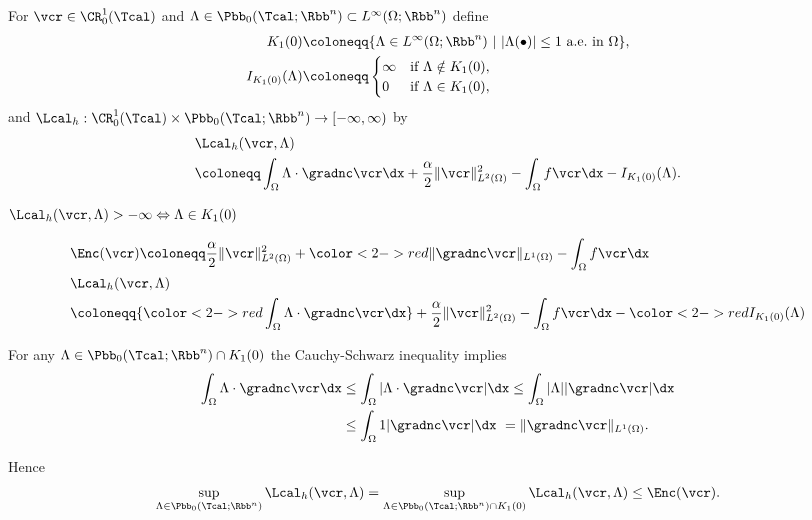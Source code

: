 \begin{frame}
  For $\vcr\in\CR^1_0(\Tcal)$ and $\Lambda\in\Pbb_0(\Tcal;\Rbb^n)\subset
  L^\infty(\Omega;\Rbb^n)$ define
  \begin{align*}
    K_1(0)
    &\coloneqq 
    \{\Lambda\in L^\infty(\Omega;\Rbb^n)\ | \ |\Lambda(\bullet)|
    \leq 1 \text{ a.e.\ in }\Omega\},\\
    I_{K_1(0)}(\Lambda)
    &\coloneqq
    \begin{cases}
      \infty & \text{if } \Lambda\notin K_1(0),\\
      0       & \text{if } \Lambda\in K_1(0),
    \end{cases}
  \end{align*}
  \pause
  and $\Lcal_h:\CR^1_0(\Tcal)\times \Pbb_0(\Tcal;\Rbb^n)\to
  [-\infty,\infty)$ by
  \begin{align*}
    &\Lcal_h(\vcr,\Lambda) \\
    &\coloneqq \int_\Omega\Lambda\cdot\gradnc\vcr\dx +
    \frac{\alpha}{2}\Vert \vcr\Vert^2_{L^2(\Omega)} -\int_\Omega f\vcr\dx
    - I_{K_1(0)}(\Lambda).
  \end{align*}

  \pause
  \bigskip

  $\Lcal_h(\vcr,\Lambda)>-\infty \Leftrightarrow \Lambda\in K_1(0)$
\end{frame}

\begin{frame}
  \begin{align*}
    &\Enc(\vcr)\coloneqq \frac{\alpha}{2}\Vert \vcr\Vert_{L^2(\Omega)}^2
    +{\color<2->{red}\Vert \gradnc\vcr\Vert_{L^1(\Omega)}}
    -\int_\Omega f\vcr\dx\\
    &\Lcal_h(\vcr,\Lambda) \\
    &\coloneqq {\color<2->{red}\int_\Omega\Lambda\cdot\gradnc\vcr\dx} +
    \frac{\alpha}{2}\Vert \vcr\Vert^2_{L^2(\Omega)} -\int_\Omega f\vcr\dx
    - {\color<2->{red}I_{K_1(0)}(\Lambda)}
  \end{align*}

  \pause
  \pause

  For any $\Lambda\in\Pbb_0(\Tcal;\Rbb^n)\cap K_1(0)$ the Cauchy-Schwarz
  inequality implies
  \begin{align*}
    \int_\Omega \Lambda\cdot\gradnc\vcr\dx
    &\leq \int_\Omega |\Lambda\cdot\gradnc\vcr|\dx
    \leq \int_\Omega |\Lambda||\gradnc\vcr|\dx\\
    &\leq \int_\Omega 1|\gradnc\vcr|\dx\
    = \Vert\gradnc\vcr\Vert_{L^1(\Omega)}.
  \end{align*}

  \pause
  Hence
  \begin{align*}
    \sup_{\Lambda\in\Pbb_0(\Tcal;\Rbb^n)}\Lcal_h(\vcr,\Lambda)=
    \sup_{\Lambda\in\Pbb_0(\Tcal;\Rbb^n)\cap K_1(0)}\Lcal_h(\vcr,\Lambda)
    \leq \Enc(\vcr).
  \end{align*}
\end{frame}

